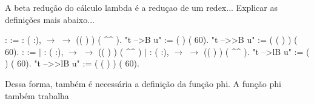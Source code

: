 A beta redução do cálculo lambda é a reduçao de um redex... Explicar as definições mais abaixo...\begin{coqdoccode}
\coqdocemptyline
\coqdocnoindent
{}  :    :=\coqdoceol
\coqdocindent{1.00em}
 : \coqdockw{\ensuremath{\forall}} ( :),   \ensuremath{\rightarrow}   \ensuremath{\rightarrow}\coqdoceol
\coqdocindent{2.00em}
 (( ) ) ( \^{}\^{} ).\coqdoceol
\coqdocnoindent
{} "t -->B u" := (   ) (  60).\coqdoceol
\coqdocnoindent
{} "t -->>B u" := ( ( )  ) (  60).\coqdoceol
\coqdocemptyline
\coqdocnoindent
{}  :    :=\coqdoceol
\coqdocindent{1.00em}
\ensuremath{|}  : \coqdockw{\ensuremath{\forall}} ( :),   \ensuremath{\rightarrow}   \ensuremath{\rightarrow}\coqdoceol
\coqdocindent{2.00em}
 (( ) ) ( \^{}\^{} )\coqdoceol
\coqdocindent{1.00em}
\ensuremath{|}  : \coqdockw{\ensuremath{\forall}} ( :),\coqdoceol
\coqdocindent{2.00em}
  \ensuremath{\rightarrow}   \ensuremath{\rightarrow}\coqdoceol
\coqdocindent{2.00em}
 (( ) ) ( \^{}\^{} ).\coqdoceol
\coqdocnoindent
{} "t -->lB u" := (   ) (  60).\coqdoceol
\coqdocnoindent
{} "t -->>lB u" := ( ( )  ) (  60).\coqdoceol
\coqdocemptyline
\end{coqdoccode}
Dessa forma, também é necessária a definição da função phi. A função phi também trabalha
